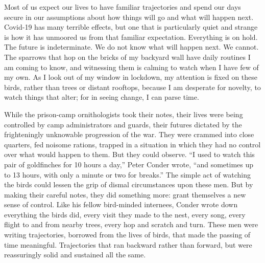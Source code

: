 Most of us expect our lives to have familiar trajectories and spend our
days secure in our assumptions about how things will go and what will
happen next. Covid-19 has many terrible effects, but one that is
particularly quiet and strange is how it has unmoored us from that
familiar expectation. Everything is on hold. The future is
indeterminate. We do not know what will happen next. We cannot. The
sparrows that hop on the bricks of my backyard wall have daily routines
I am coming to know, and witnessing them is calming to watch when I have
few of my own. As I look out of my window in lockdown, my attention is
fixed on these birds, rather than trees or distant rooftops, because I
am desperate for novelty, to watch things that alter; for in seeing
change, I can parse time.

While the prison-camp ornithologists took their notes, their lives were
being controlled by camp administrators and guards, their futures
dictated by the frighteningly unknowable progression of the war. They
were crammed into close quarters, fed noisome rations, trapped in a
situation in which they had no control over what would happen to them.
But they could observe. ``I used to watch this pair of goldfinches for
10 hours a day,'' Peter Conder wrote, ``and sometimes up to 13 hours,
with only a minute or two for breaks.'' The simple act of watching the
birds could lessen the grip of dismal circumstances upon these men. But
by making their careful notes, they did something more: grant themselves
a new sense of control. Like his fellow bird-minded internees, Conder
wrote down everything the birds did, every visit they made to the nest,
every song, every flight to and from nearby trees, every hop and scratch
and turn. These men were writing trajectories, borrowed from the lives
of birds, that made the passing of time meaningful. Trajectories that
ran backward rather than forward, but were reassuringly solid and
sustained all the same.

